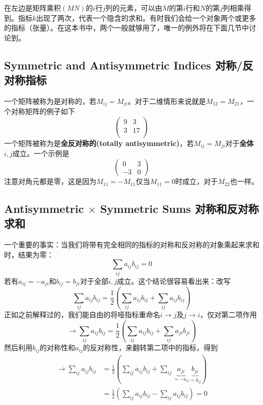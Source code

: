 在左边是矩阵乘积$(MN)$的$i$行$j$列的元素，可以由$M$的第$i$行和$N$的第$j$列相乘得到。指标$k$出现了两次，代表一个隐含的求和。有时我们会给一个对象两个或更多的指标（张量）。在这本书中，两个一般就够用了，唯一的例外将在下面几节中讨论到。

\subsection[对称/反对称指标]{Symmetric and Antisymmetric Indices 对称/反对称指标}\label{appendix.B.5.3}
一个矩阵被称为是对称的，若$M_{ij}=M_{ji}$。对于二维情形来说就是$M_{12}=M_{21}$，一个对称矩阵的例子如下
\begin{equation}
\begin{pmatrix}
9 & 3 \\ 3 & 17 \\
\end{pmatrix}
\end{equation}
一个矩阵被称为是{\bf 全反对称的(totally antisymmetric)}，若$M_{ij}=M_{ji}$对于{\bf 全体}$i,j$成立。一个示例是
\begin{equation}
\begin{pmatrix}
0 & 3 \\ -3 & 0
\end{pmatrix}
\end{equation}
注意对角元都是零，这是因为$M_{11}=-M_{11}$仅当$M_{11}=0$时成立，对于$M_{22}$也一样。
\subsection[对称和反对称求和]{Antisymmetric $\times$ Symmetric Sums 对称和反对称求和}\label{appendix.B.5.4}
一个重要的事实：当我们将带有完全相同的指标的对称和反对称的对象乘起来求和时，结果为零：
\begin{equation}
\sum\limits_{ij}a_{ij}b_{ij} = 0
\end{equation}
若有$a_{ij}=-a_{ji}$和$b_{ij}=b_{ji}$对于全部$i,j$成立。这个结论很容易看出来：改写
\begin{equation}
\sum\limits_{ij}a_{ij}b_{ij} = \frac{1}{2}\left(\sum\limits_{ij}a_{ij}b_{ij}+\sum\limits_{ij}a_{ij}b_{ij}\right)
\end{equation}
正如之前解释过的，我们能自由的将哑指标重命名$i\rightarrow j$及$j\rightarrow i$，仅对第二项作用
\begin{equation}
\rightarrow \sum\limits_{ij}a_{ij}b_{ij} = \frac{1}{2}\left(\sum\limits_{ij}a_{ij}b_{ij}+\sum\limits_{ij}a_{ji}b_{ji}\right)
\end{equation}
然后利用$b_{ij}$的对称性和$a_{ij}$的反对称性，来翻转第二项中的指标，得到%
\begin{equation}
\begin{aligned}
\rightarrow \sum\limits_{ij}a_{ij}b_{ij} &= \frac{1}{2}\left(\sum\limits_{ij}a_{ij}b_{ij}+\sum\limits_{ij}\underbrace{a_{ji}}_{=-a_{ij}}\underbrace{b_{ji}}_{=b_{ij}}\right)\\
 &= \frac{1}{2}\left(\sum\limits_{ij}a_{ij}b_{ij}-\sum\limits_{ij}a_{ij}b_{ij}\right) = 0
\end{aligned}
\end{equation}
